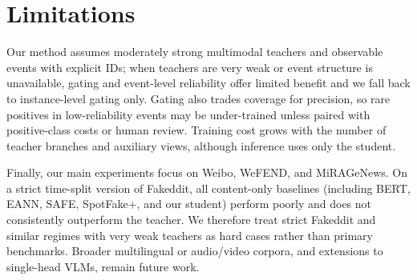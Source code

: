 \section{Limitations}
Our method assumes moderately strong multimodal teachers and observable events with explicit IDs; when teachers are very weak or event structure is unavailable, gating and event-level reliability offer limited benefit and we fall back to instance-level gating only. Gating also trades coverage for precision, so rare positives in low-reliability events may be under-trained unless paired with positive-class costs or human review. Training cost grows with the number of teacher branches and auxiliary views, although inference uses only the student.

Finally, our main experiments focus on Weibo, WeFEND, and MiRAGeNews. On a strict time-split version of Fakeddit, all content-only baselines (including BERT, EANN, SAFE, SpotFake+, and our student) perform poorly and \modelname{} does not consistently outperform the teacher. We therefore treat strict Fakeddit and similar regimes with very weak teachers as hard cases rather than primary benchmarks. Broader multilingual or audio/video corpora, and extensions to single-head VLMs, remain future work.
